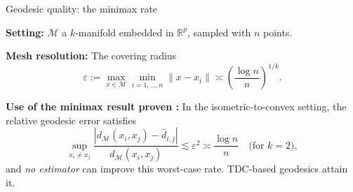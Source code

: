 \documentclass[9pt]{beamer}
\renewcommand{\leq}{\leqslant}
\newcommand{\norm}[1]{\left\|#1\right\|}
\begin{document}

















\begin{frame}{Geodesic quality: the minimax rate}

\textbf{Setting:} $\mathcal{M}$ a $k$-manifold embedded in $\mathbb{R}^p$, sampled with $n$ points.

\medskip

\textbf{Mesh resolution:} The covering radius 
\[
\varepsilon := \max_{x\in\mathcal{M}}\min_{i=1,\dots,n} \|x-x_i\| 
\asymp \left(\frac{\log n}{n}\right)^{1/k}.
\]

\medskip

\textbf{Use of the minimax result proven :} 
In the isometric-to-convex setting, the relative geodesic error satisfies
\[
\sup_{x_i \neq x_j} \frac{\left| d_{\mathcal{M}}(x_i, x_j) - \widehat{d}_{i,j}\right| }{d_{\mathcal{M}}(x_i, x_j)} 
\lesssim \varepsilon^2 \asymp \frac{\log n}{n}
\quad \text{(for $k=2$)},
\]
and \textit{no estimator} can improve this worst-case rate. 
TDC-based geodesics attain it.

\end{frame}
\end{document}
